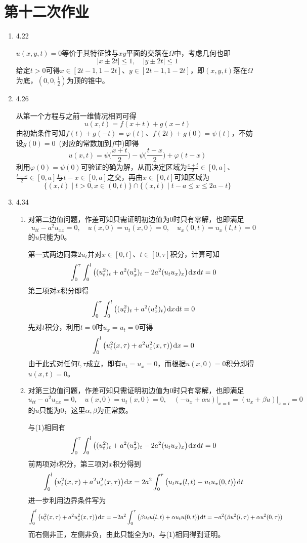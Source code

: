 \documentclass[a4paper,UTF8,fontset=windows,10pt]{ctexart}
\newcommand*{\dr}{\hspace{0.07em}\mathrm{d}}
\begin{document}
\section{第十二次作业}
\begin{enumerate}
    \item 4.22
    
    $u(x,y,t)=0$等价于其特征锥与$xy$平面的交落在$\Omega$中，考虑几何也即
    $$|x\pm2t|\le1,\quad|y\pm2t|\le1$$
    给定$t>0$可得$x\in[2t-1,1-2t]$、$y\in[2t-1,1-2t]$，即$(x,y,t)$落在$\Omega$为底，$(0,0,\frac{1}{2})$为顶的锥中。
    
    \item 4.26
    
    从第一个方程与之前一维情况相同可得
    $$u(x,t)=f(x+t)+g(x-t)$$
    由初始条件可知$f(t)+g(-t)=\varphi(t)$、$f(2t)+g(0)=\psi(t)$，不妨设$g(0)=0$\ (对应的常数加到$f$中)即得
    $$u(x,t)=\psi\bigg(\frac{x+t}{2}\bigg)-\psi\bigg(\frac{t-x}{2}\bigg)+\varphi(t-x)$$
    利用$\varphi(0)=\psi(0)$可验证的确为解，从而决定区域为$\frac{x+t}{2}\in[0,a]$、$\frac{t-x}{2}\in[0,a]$与$t-x\in[0,a]$之交，再由$x\in[0,t]$可知区域为
    $$\{(x,t)\mid t>0,x\in(0,t)\}\cap\{(x,t)\mid t-a\le x\le 2a-t\}$$
    
    \item 4.34
    \begin{enumerate}[(1)]
        \item 对第二边值问题，作差可知只需证明初边值为0时只有零解，也即满足
        $$u_{tt}-a^2u_{xx}=0,\quad u(x,0)=u_t(x,0)=0,\quad u_x(0,t)=u_x(l,t)=0$$
        的$u$只能为0。
    
        第一式两边同乘$2u_t$并对$x\in[0,l]$、$t\in[0,\tau]$积分，计算可知
        $$\int_0^\tau\int_0^l\big((u_t^2)_t+a^2(u_x^2)_t-2a^2(u_tu_x)_x\big)\dr x\dr t=0$$
        第三项对$x$积分即得
        $$\int_0^\tau\int_0^l\big((u_t^2)_t+a^2(u_x^2)_t\big)\dr x\dr t=0$$
        先对$t$积分，利用$t=0$时$u_x=u_t=0$可得
        $$\int_0^l\big(u_t^2(x,\tau)+a^2u_x^2(x,\tau)\big)\dr x=0$$
        由于此式对任何$l,\tau$成立，即有$u_t=u_x=0$，而根据$u(x,0)=0$积分即得$u(x,t)=0$。
    
        \item 对第三边值问题，作差可知只需证明初边值为0时只有零解，也即满足
        $$u_{tt}-a^2u_{xx}=0,\quad u(x,0)=u_t(x,0)=0,\quad (-u_x+\alpha u)\big|_{x=0}=(u_x+\beta u)\big|_{x=l}=0$$
        的$u$只能为0，这里$\alpha,\beta$为正常数。
    
        与(1)相同有
        $$\int_0^\tau\int_0^l\big((u_t^2)_t+a^2(u_x^2)_t-2a^2(u_tu_x)_x\big)\dr x\dr t=0$$
        前两项对$t$积分，第三项对$x$积分得到
        $$\int_0^l\big(u_t^2(x,\tau)+a^2u_x^2(x,\tau)\big)\dr x=2a^2\int_0^\tau\big(u_tu_x(l,t)-u_tu_x(0,t)\big)\dr t$$
        进一步利用边界条件写为
        $$\int_0^l\big(u_t^2(x,\tau)+a^2u_x^2(x,\tau)\big)\dr x=-2a^2\int_0^\tau\big(\beta u_tu(l,t)+\alpha u_tu(0,t)\big)\dr t=-a^2(\beta u^2(l,\tau)+\alpha u^2(0,\tau))$$
        而右侧非正，左侧非负，由此只能全为0，与(1)相同得到证明。
    \end{enumerate}
    

\end{enumerate}
\end{document}

